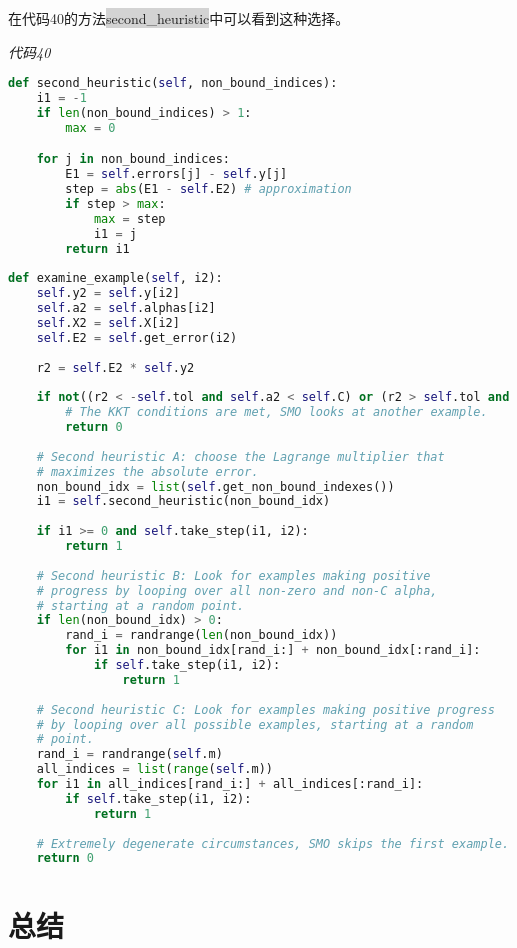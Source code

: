 在代码40的方法\colorbox{lightgray}{second\_heuristic}中可以看到这种选择。

\emph{代码40}

\begin{lstlisting}[language=python]
def second_heuristic(self, non_bound_indices): 
    i1 = -1 
    if len(non_bound_indices) > 1: 
        max = 0 

    for j in non_bound_indices: 
        E1 = self.errors[j] - self.y[j] 
        step = abs(E1 - self.E2) # approximation 
        if step > max: 
            max = step 
            i1 = j 
        return i1 
        
def examine_example(self, i2): 
    self.y2 = self.y[i2] 
    self.a2 = self.alphas[i2] 
    self.X2 = self.X[i2] 
    self.E2 = self.get_error(i2) 
    
    r2 = self.E2 * self.y2 
    
    if not((r2 < -self.tol and self.a2 < self.C) or (r2 > self.tol and self.a2 > 0)): 
        # The KKT conditions are met, SMO looks at another example. 
        return 0 
    
    # Second heuristic A: choose the Lagrange multiplier that 
    # maximizes the absolute error. 
    non_bound_idx = list(self.get_non_bound_indexes()) 
    i1 = self.second_heuristic(non_bound_idx) 
    
    if i1 >= 0 and self.take_step(i1, i2): 
        return 1 
        
    # Second heuristic B: Look for examples making positive 
    # progress by looping over all non-zero and non-C alpha, 
    # starting at a random point. 
    if len(non_bound_idx) > 0: 
        rand_i = randrange(len(non_bound_idx)) 
        for i1 in non_bound_idx[rand_i:] + non_bound_idx[:rand_i]: 
            if self.take_step(i1, i2): 
                return 1 
                
    # Second heuristic C: Look for examples making positive progress 
    # by looping over all possible examples, starting at a random
    # point. 
    rand_i = randrange(self.m) 
    all_indices = list(range(self.m)) 
    for i1 in all_indices[rand_i:] + all_indices[:rand_i]: 
        if self.take_step(i1, i2): 
            return 1 
    
    # Extremely degenerate circumstances, SMO skips the first example. 
    return 0
\end{lstlisting}

\section{总结}

